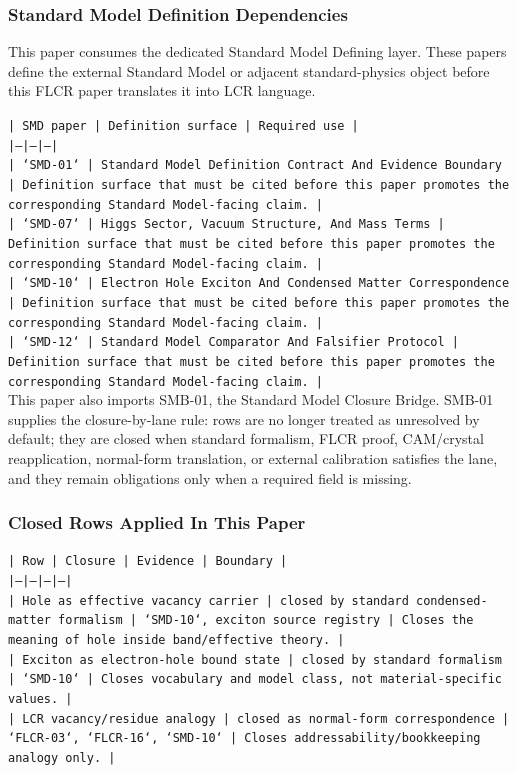 \documentclass[11pt]{article}
\begin{document}
\subsubsection*{Standard Model Definition Dependencies}

This paper consumes the dedicated Standard Model Defining layer. These papers define the external Standard Model or adjacent standard-physics object before this FLCR paper translates it into LCR language.

\noindent\texttt{| SMD paper | Definition surface | Required use |}\\
\noindent\texttt{|---|---|---|}\\
\noindent\texttt{| `SMD-01` | Standard Model Definition Contract And Evidence Boundary | Definition surface that must be cited before this paper promotes the corresponding Standard Model-facing claim. |}\\
\noindent\texttt{| `SMD-07` | Higgs Sector, Vacuum Structure, And Mass Terms | Definition surface that must be cited before this paper promotes the corresponding Standard Model-facing claim. |}\\
\noindent\texttt{| `SMD-10` | Electron Hole Exciton And Condensed Matter Correspondence | Definition surface that must be cited before this paper promotes the corresponding Standard Model-facing claim. |}\\
\noindent\texttt{| `SMD-12` | Standard Model Comparator And Falsifier Protocol | Definition surface that must be cited before this paper promotes the corresponding Standard Model-facing claim. |}\\

This paper also imports SMB-01, the Standard Model Closure Bridge. SMB-01 supplies the closure-by-lane rule: rows are no longer treated as unresolved by default; they are closed when standard formalism, FLCR proof, CAM/crystal reapplication, normal-form translation, or external calibration satisfies the lane, and they remain obligations only when a required field is missing.

\subsubsection*{Closed Rows Applied In This Paper}

\noindent\texttt{| Row | Closure | Evidence | Boundary |}\\
\noindent\texttt{|---|---|---|---|}\\
\noindent\texttt{| Hole as effective vacancy carrier | closed by standard condensed-matter formalism | `SMD-10`, exciton source registry | Closes the meaning of hole inside band/effective theory. |}\\
\noindent\texttt{| Exciton as electron-hole bound state | closed by standard formalism | `SMD-10` | Closes vocabulary and model class, not material-specific values. |}\\
\noindent\texttt{| LCR vacancy/residue analogy | closed as normal-form correspondence | `FLCR-03`, `FLCR-16`, `SMD-10` | Closes addressability/bookkeeping analogy only. |}\\
\end{document}
